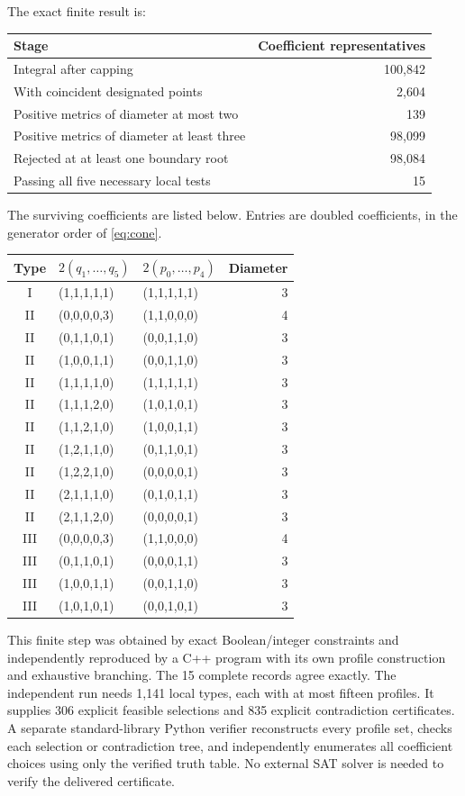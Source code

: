The exact finite result is:
\begin{center}
\begin{tabular}{@{}lr@{}}\toprule
Stage & Coefficient representatives\\\midrule
Integral after capping & 100,842\\
With coincident designated points & 2,604\\
Positive metrics of diameter at most two & 139\\
Positive metrics of diameter at least three & 98,099\\
Rejected at at least one boundary root & 98,084\\
Passing all five necessary local tests & 15\\\bottomrule
\end{tabular}
\end{center}
The surviving coefficients are listed below. Entries are doubled
coefficients, in the generator order of \eqref{eq:cone}.
\begin{center}\small
\begin{tabular}{@{}cllr@{}}\toprule
Type & $2(q_1,\ldots,q_5)$ & $2(p_0,\ldots,p_4)$ & Diameter\\\midrule
I &(1,1,1,1,1)&(1,1,1,1,1)&3\\
II&(0,0,0,0,3)&(1,1,0,0,0)&4\\
II&(0,1,1,0,1)&(0,0,1,1,0)&3\\
II&(1,0,0,1,1)&(0,0,1,1,0)&3\\
II&(1,1,1,1,0)&(1,1,1,1,1)&3\\
II&(1,1,1,2,0)&(1,0,1,0,1)&3\\
II&(1,1,2,1,0)&(1,0,0,1,1)&3\\
II&(1,2,1,1,0)&(0,1,1,0,1)&3\\
II&(1,2,2,1,0)&(0,0,0,0,1)&3\\
II&(2,1,1,1,0)&(0,1,0,1,1)&3\\
II&(2,1,1,2,0)&(0,0,0,0,1)&3\\
III&(0,0,0,0,3)&(1,1,0,0,0)&4\\
III&(0,1,1,0,1)&(0,0,0,1,1)&3\\
III&(1,0,0,1,1)&(0,0,1,1,0)&3\\
III&(1,0,1,0,1)&(0,0,1,0,1)&3\\\bottomrule
\end{tabular}
\end{center}

This finite step was obtained by exact Boolean/integer constraints and
independently reproduced by a C++ program with its own profile construction
and exhaustive branching. The 15 complete records agree exactly.
The independent run needs 1,141 local types, each with at most fifteen
profiles. It supplies 306 explicit feasible selections and 835 explicit
contradiction certificates. A separate standard-library Python verifier
reconstructs every profile set, checks each selection or contradiction
tree, and independently enumerates all coefficient choices using only
the verified truth table. No external SAT solver is needed to verify the
delivered certificate.

